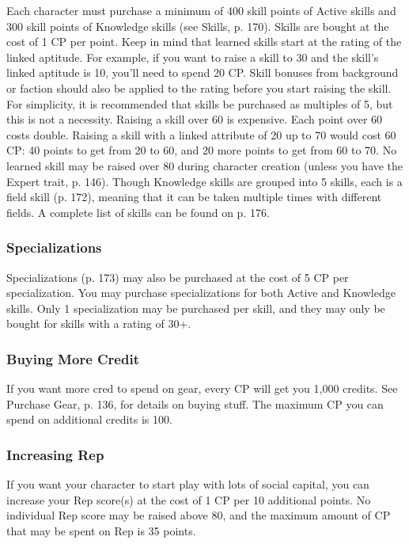 Each character must purchase a minimum of 400 skill points of Active skills and 300 skill points of Knowledge skills (see Skills, p. 170). Skills are bought at the cost of 1 CP per point. Keep in mind that learned skills start at the rating of the linked aptitude. For example, if you want to raise a skill to 30 and the skill’s linked aptitude is 10, you’ll need to spend 20 CP. Skill bonuses from background or faction should also be applied to the rating before you start raising the skill. For simplicity, it is recommended that skills be purchased as multiples of 5, but this is not a necessity. Raising a skill over 60 is expensive. Each point over 60 costs double. Raising a skill with a linked attribute of 20 up to 70 would cost 60 CP: 40 points to get from 20 to 60, and 20 more points to get from 60 to 70. No learned skill may be raised over 80 during character creation (unless you have the Expert trait, p. 146). Though Knowledge skills are grouped into 5 skills, each is a field skill (p. 172), meaning that it can be taken multiple times with different fields. A complete list of skills can be found on p. 176.

\subsubsection{Specializations}
\label{sec:buying-specializations}

Specializations (p. 173) may also be purchased at the cost of 5 CP per specialization. You may purchase specializations for both Active and Knowledge skills. Only 1 specialization may be purchased per skill, and they may only be bought for skills with a rating of 30+.

\subsubsection{Buying More Credit}
\label{sec:buying-credit}

If you want more cred to spend on gear, every CP will get you 1,000 credits. See Purchase Gear, p. 136, for details on buying stuff. The maximum CP you can spend on additional credits is 100.

\subsubsection{Increasing Rep}
\label{sec:increasing-rep}

If you want your character to start play with lots of social capital, you can increase your Rep score(s) at the cost of 1 CP per 10 additional points. No individual Rep score may be raised above 80, and the maximum amount of CP that may be spent on Rep is 35 points.

